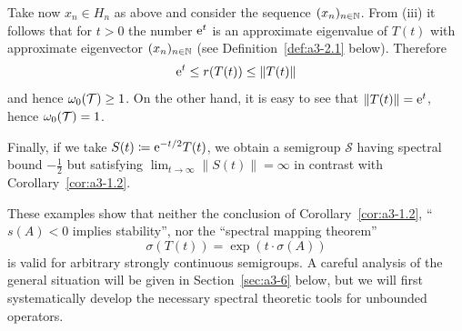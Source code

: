 Take now $x_{n} \in H_{n}$ as above and consider the sequence $(x_{n})_{n \in \mathbb{N}}$.
From (iii) it follows that for $t > 0$ the number $\mathrm{e}^{t}$ is an approximate eigenvalue of\/ $T(t)$ with approximate eigenvector $(x_{n})_{n \in \mathbb{N}}$ (see Definition~\ref{def:a3-2.1} below).
Therefore 
%
\[
	 \eu^{t} \leq r(T(t)) \leq \|T(t)\|
\]
%
and hence $\omega_{0}(\TT) \geq 1$.
On the other hand, it is easy to see that $\|T(t)\| = \mathrm{e}^{t}$, hence $\omega_{0}(\mathcal{T}) = 1$.


Finally, if we take $S(t) \coloneq \mathrm{e}^{-t/2}T(t)$, we obtain a semigroup $\mathcal{S}$ 
having spectral bound $-\frac{1}{2}$ but satisfying $\lim_{t \to \infty} \|S(t)\| = \infty$ in contrast with Corollary~\ref{cor:a3-1.2}.

These examples show that neither the conclusion of Corollary~\ref{cor:a3-1.2}, \ie \enquote{$s(A) < 0$ implies stability}, nor the \enquote{spectral mapping theorem}
\[
    \sigma(T(t)) = \exp(t\cdot\sigma(A))
\]
is valid for arbitrary strongly continuous semigroups.
A careful analysis of the general situation will be given in Section~\ref{sec:a3-6} below, but we will first systematically develop the necessary spectral theoretic tools for unbounded operators.
